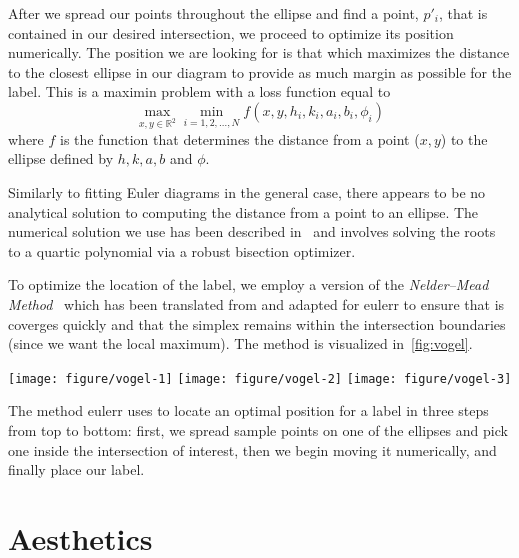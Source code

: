 \documentclass[
  oneside,
  openany,
  numbers=noendperiod,
  parskip=half,
  bibliography=totoc
]{scrbook}\usepackage[]{graphicx}\usepackage{xcolor}
\newenvironment{knitrout}{}{} %
\newcommand{\pkg}[1]{{\fontseries{b}\selectfont #1}}
\begin{document}
After we spread our points throughout the ellipse and find a point, $p'_i$, that
is contained in our desired intersection, we proceed to optimize its position
numerically. The position we are looking for is that which maximizes the
distance to the closest ellipse in our diagram to provide as much margin as
possible for the label. This is a maximin problem with a loss function equal to
\begin{equation}
\max_{x,y \in \mathbb{R}^2} \min_{i=1,2,\dots,N} f(x,y,h_i,k_i,a_i,b_i,\phi_i)
\label{eq:lossDist}
\end{equation}
where $f$ is the function that determines the distance from a point ($x,y$) to the ellipse defined by $h,k,a,b$ and $\phi$.

Similarly to fitting Euler diagrams in the general case, there appears to be no
analytical solution to computing the distance from a point to an ellipse. The
numerical solution we use has been described in~\citet{Eberly_2016a} and
involves solving the roots to a quartic polynomial via a robust
bisection optimizer.

To optimize the location of the label, we employ a version of the
\emph{Nelder--Mead Method}~\citep{Nelder_1965} which has been translated from
\citet{Kelley_1999} and adapted for \pkg{eulerr} to ensure that is coverges
quickly and that the simplex remains within the intersection boundaries
(since we want the local maximum). The method is visualized in~\cref{fig:vogel}.
\begin{marginfigure}
\begin{knitrout}\small
{}\color{fgcolor}

{\centering \texttt{[image: figure/vogel-1]} 
\texttt{[image: figure/vogel-2]} 
\texttt{[image: figure/vogel-3]} 

}



\end{knitrout}
\caption{The method eulerr uses to locate an optimal position for a label in
three steps from top to bottom: first, we spread sample points on one of the
ellipses and pick one inside the intersection of interest, then we begin moving
it numerically, and finally place our label.}
\label{fig:vogel}
\end{marginfigure}

\section{Aesthetics}
\label{sec:aesthetics}
\end{document}
